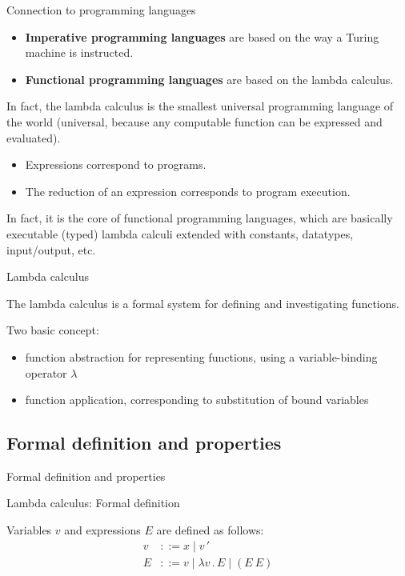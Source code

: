 \documentclass[xcolor=dvipsnames]{beamer}
\begin{document}
\begin{frame}{Connection to programming languages}

\begin{itemize}
\item {\bf Imperative programming languages} are based on the way a Turing machine is instructed. 
\item {\bf Functional programming languages} are based on the lambda calculus. 
\end{itemize}

In fact, the lambda calculus is the smallest universal programming language 
of the world (universal, because any computable function can be expressed and evaluated). 
\begin{itemize}
\item Expressions correspond to programs. 
\item The reduction of an expression corresponds to program execution.
\end{itemize}
In fact, it is the core of functional programming languages, which are 
basically executable (typed) lambda calculi extended with constants, 
datatypes, input/output, etc.
\end{frame}


\begin{frame}{Lambda calculus}

The lambda calculus is a formal system for 
defining and investigating functions. 

Two basic concept:
\begin{itemize}
\item function abstraction for representing functions, using a variable-binding operator $\lambda$
\item function application, corresponding to substitution of bound variables
\end{itemize}
\end{frame}


\subsection{Formal definition and properties}

\begin{frame}{}

\begin{center}
{\Large Formal definition and properties}
\end{center}
\end{frame}


\begin{frame}[fragile]{Lambda calculus: Formal definition}

Variables $v$ and expressions $E$ are defined as follows:
\begin{align*}
v & ::= x \mid v\,' \\
E & ::= v \mid \lambda v\,.\,E \mid (E\ E)
\end{align*}
\end{frame}
\end{document}
